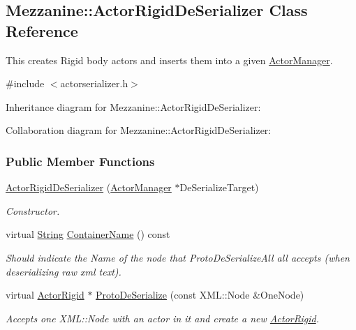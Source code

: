 \hypertarget{classMezzanine_1_1ActorRigidDeSerializer}{\subsection{Mezzanine\-:\-:Actor\-Rigid\-De\-Serializer Class Reference}
\label{classMezzanine_1_1ActorRigidDeSerializer}
}


This creates Rigid body actors and inserts them into a given \hyperlink{classMezzanine_1_1ActorManager}{Actor\-Manager}.  




{\ttfamily \#include $<$actorserializer.\-h$>$}



Inheritance diagram for Mezzanine\-:\-:Actor\-Rigid\-De\-Serializer\-:


Collaboration diagram for Mezzanine\-:\-:Actor\-Rigid\-De\-Serializer\-:
\subsubsection*{Public Member Functions}
\begin{DoxyCompactItemize}
\item 
\hyperlink{classMezzanine_1_1ActorRigidDeSerializer_a97354288510148767134246ac26d319b}{Actor\-Rigid\-De\-Serializer} (\hyperlink{classMezzanine_1_1ActorManager}{Actor\-Manager} $\ast$De\-Serialize\-Target)
\begin{DoxyCompactList}\small\item\em Constructor. \end{DoxyCompactList}\item 
virtual \hyperlink{namespaceMezzanine_acf9fcc130e6ebf08e3d8491aebcf1c86}{String} \hyperlink{classMezzanine_1_1ActorRigidDeSerializer_a4f28a9c4679891e249f9f5e4381a3f93}{Container\-Name} () const 
\begin{DoxyCompactList}\small\item\em Should indicate the Name of the node that Proto\-De\-Serialize\-All all accepts (when deserializing raw xml text). \end{DoxyCompactList}\item 
virtual \hyperlink{classMezzanine_1_1ActorRigid}{Actor\-Rigid} $\ast$ \hyperlink{classMezzanine_1_1ActorRigidDeSerializer_a43aa00f112ec13168a8369183099099f}{Proto\-De\-Serialize} (const X\-M\-L\-::\-Node \&One\-Node)
\begin{DoxyCompactList}\small\item\em Accepts one X\-M\-L\-::\-Node with an actor in it and create a new \hyperlink{classMezzanine_1_1ActorRigid}{Actor\-Rigid}. \end{DoxyCompactList}\end{DoxyCompactItemize}
